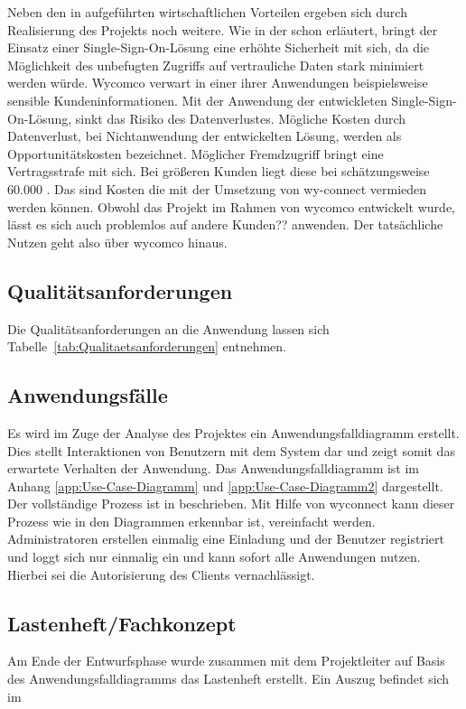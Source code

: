 Neben den in  aufgeführten wirtschaftlichen Vorteilen ergeben sich durch Realisierung des Projekts noch weitere.
Wie in der  schon erläutert, bringt der Einsatz einer Single-Sign-On-Lösung eine erhöhte Sicherheit mit sich, da die Möglichkeit des unbefugten Zugriffs auf vertrauliche Daten stark minimiert werden würde. Wycomco verwart in einer ihrer Anwendungen beispielsweise sensible Kundeninformationen. Mit der Anwendung der entwickleten Single-Sign-On-Lösung, sinkt das Risiko des Datenverlustes. Mögliche Kosten durch Datenverlust, bei Nichtanwendung der entwickelten Lösung, werden als  Opportunitätskosten bezeichnet. Möglicher Fremdzugriff bringt eine Vertragsstrafe mit sich. Bei größeren Kunden liegt diese bei schätzungsweise 60.000 \eur. Das sind Kosten die mit der Umsetzung von wy-connect vermieden werden können. 
Obwohl das Projekt im Rahmen von wycomco entwickelt wurde, lässt es sich auch problemlos auf andere Kunden?? anwenden. Der tatsächliche Nutzen geht also über wycomco hinaus.

\subsection{Qualitätsanforderungen}
\label{sec:Qualitaetsanforderungen}

Die Qualitätsanforderungen an die Anwendung lassen sich Tabelle~\ref{tab:Qualitaetsanforderungen} entnehmen.

\subsection{Anwendungsfälle}
\label{sec:Anwendungsfaelle}

Es wird im Zuge der Analyse des Projektes ein Anwendungsfalldiagramm erstellt. Dies stellt Interaktionen von Benutzern mit dem System dar und zeigt somit das erwartete Verhalten der Anwendung. Das Anwendungsfalldiagramm ist im Anhang \ref{app:Use-Case-Diagramm} und \ref{app:Use-Case-Diagramm2} dargestellt.
Der vollständige Prozess ist in  beschrieben.
Mit Hilfe von wyconnect kann dieser Prozess wie in den Diagrammen erkennbar ist, vereinfacht werden. Administratoren erstellen einmalig eine Einladung und der Benutzer registriert und loggt sich nur einmalig ein und kann sofort alle Anwendungen nutzen. Hierbei sei die Autorisierung des Clients vernachlässigt. 

\subsection{Lastenheft/Fachkonzept}
Am Ende der Entwurfsphase wurde zusammen mit dem Projektleiter auf Basis des Anwendungsfalldiagramms das Lastenheft erstellt. Ein Auszug befindet sich im 

